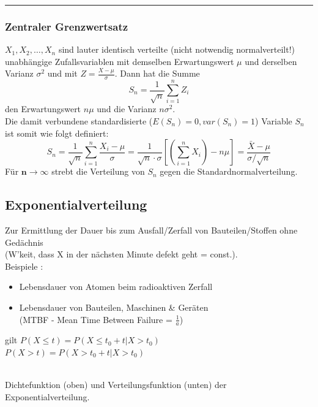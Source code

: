 \hrule
	
\subsubsection{Zentraler Grenzwertsatz}
$X_1, X_2, \ldots , X_n$ sind lauter identisch verteilte (nicht notwendig normalverteilt!)
unabhängige Zufallsvariablen mit demselben Erwartungswert $\mu$ und derselben Varianz $\sigma^2$
und mit $Z = \frac{X-\mu}{\sigma}$. Dann hat die Summe
\begin{equation}
	S_n = \frac{1}{\sqrt{n}}\sum_{i=1}^n Z_i \nonumber
\end{equation}
den Erwartungswert $n \mu$ und die Varianz $n \sigma^2$.\\
Die damit verbundene standardisierte ($E(S_n) = 0, var(S_n) = 1$) Variable $S_n$ ist somit wie
folgt definiert: \\ 
\begin{equation}
	S_n = \frac{1}{\sqrt{n}}\sum_{i=1}^n \frac{X_i - \mu}{\sigma}
	= \frac{1}{\sqrt{n}\cdot \sigma}\left[\left(\sum\limits_{i=1}^n X_i\right) -n \mu\right]
	=\dfrac{\bar{X} - \mu}{\sigma / \sqrt{n}} \nonumber
\end{equation}
Für $\boldsymbol{n \to \infty}$ strebt die Verteilung von $S_n$ gegen die
Standardnormalverteilung. \\


\subsection{Exponentialverteilung}

\begin{minipage}{0.6\textwidth}
	Zur Ermittlung der Dauer bis zum Ausfall/Zerfall von Bauteilen/Stoffen ohne Gedächnis\\
	(W'keit, dass X in der nächsten Minute defekt geht = const.).\\
	Beispiele :
	\begin{itemize}
		\item Lebensdauer von Atomen beim radioaktiven Zerfall
		\item Lebensdauer von Bauteilen, Maschinen \& Geräten\\(MTBF -
		Mean Time Between Failure = $\frac{1}{a}$)
	\end{itemize}
	
	gilt $P(X \leq t) = P(X \leq t_0 + t | X > t_0)$\\
	$P(X > t) = P(X > t_0 + t | X > t_0)$\\
	
	
\end{minipage} \hspace{0.05\textwidth}
\begin{minipage}{0.35\textwidth}
	\\
	Dichtefunktion (oben) und Verteilungsfunktion (unten) der
	Exponentialverteilung.
\end{minipage}

